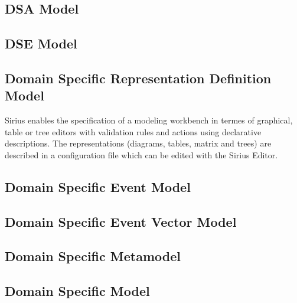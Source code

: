 \documentclass{gemoc} %
\begin{document}

\subsection{DSA Model}


\subsection{DSE Model}


\subsection{Domain Specific  Representation Definition Model}
Sirius enables the specification of a modeling workbench in termes of graphical, table or tree editors with validation rules and actions using declarative descriptions. The representations (diagrams, tables, matrix and trees) are described in a configuration file which can be edited with the Sirius Editor.

\subsection{Domain Specific Event Model}


\subsection{Domain Specific Event Vector Model}


\subsection{Domain Specific Metamodel}


\subsection{Domain Specific Model}
\end{document}
